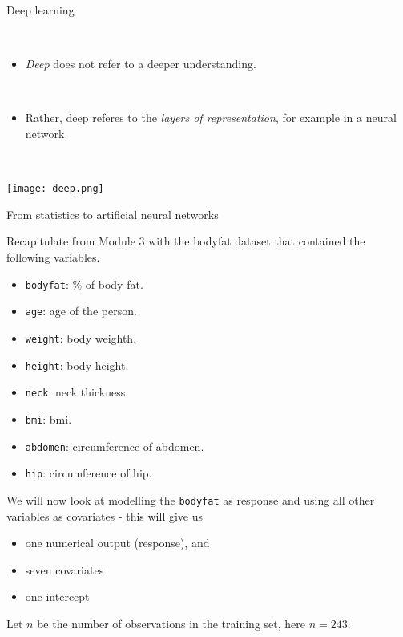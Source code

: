 \documentclass[10pt,ignorenonframetext,]{beamer}
\providecommand{\tightlist}{%
  \setlength{\itemsep}{0pt}\setlength{\parskip}{0pt}}
\begin{document}
\begin{frame}

\begin{block}{Deep learning}

\(~\)

\begin{itemize}
\tightlist
\item
  \emph{Deep} does not refer to a deeper understanding.
\end{itemize}

\(~\)

\begin{itemize}
\tightlist
\item
  Rather, deep referes to the \emph{layers of representation}, for
  example in a neural network.
\end{itemize}

\(~\)

\center

\texttt{[image: deep.png]}

\end{block}

\end{frame}

\begin{frame}[fragile]{From statistics to artificial neural networks}
\protect\hypertarget{from-statistics-to-artificial-neural-networks}{}

Recapitulate from Module 3 with the bodyfat dataset that contained the
following variables.

\begin{itemize}
\tightlist
\item
  \texttt{bodyfat}: \% of body fat.
\item
  \texttt{age}: age of the person.
\item
  \texttt{weight}: body weighth.
\item
  \texttt{height}: body height.
\item
  \texttt{neck}: neck thickness.
\item
  \texttt{bmi}: bmi.
\item
  \texttt{abdomen}: circumference of abdomen.
\item
  \texttt{hip}: circumference of hip.
\end{itemize}

\end{frame}

\begin{frame}[fragile]

We will now look at modelling the \texttt{bodyfat} as response and using
all other variables as covariates - this will give us

\begin{itemize}
\tightlist
\item
  one numerical output (response), and
\item
  seven covariates
\item
  one intercept
\end{itemize}

Let \(n\) be the number of observations in the training set, here
\(n=243\).

\end{frame}
\end{document}
